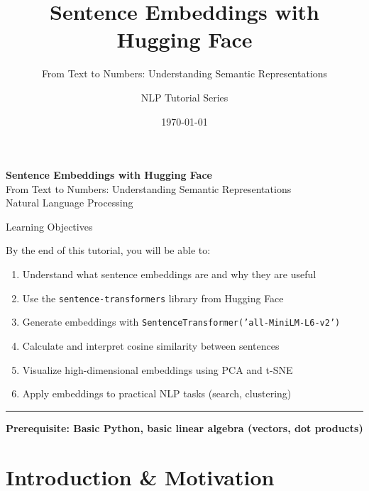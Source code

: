 \documentclass[8pt,aspectratio=169]{beamer}
\title{Sentence Embeddings with Hugging Face}
\subtitle{From Text to Numbers: Understanding Semantic Representations}
\author{NLP Tutorial Series}
\institute{Natural Language Processing}
\date{\today}
\newcommand{\bottomnote}[1]{%
\vfill
\vspace{-2mm}
\textcolor{mllavender2}{\rule{\textwidth}{0.4pt}}
\vspace{1mm}
\footnotesize
\textbf{#1}
}
\begin{document}
\begin{frame}[plain]
\vspace{1.5cm}
\begin{center}
{\Huge\textbf{Sentence Embeddings with Hugging Face}}\\[0.5cm]
{\Large From Text to Numbers: Understanding Semantic Representations}\\[2cm]
{\normalsize Natural Language Processing}
\end{center}
\end{frame}

\begin{frame}[t]{Learning Objectives}

By the end of this tutorial, you will be able to:

\vspace{0.5cm}

\begin{enumerate}
    \item Understand what sentence embeddings are and why they are useful
    \item Use the \texttt{sentence-transformers} library from Hugging Face
    \item Generate embeddings with \texttt{SentenceTransformer('all-MiniLM-L6-v2')}
    \item Calculate and interpret cosine similarity between sentences
    \item Visualize high-dimensional embeddings using PCA and t-SNE
    \item Apply embeddings to practical NLP tasks (search, clustering)
\end{enumerate}

\bottomnote{Prerequisite: Basic Python, basic linear algebra (vectors, dot products)}
\end{frame}

\section{Introduction \& Motivation}
\end{document}
